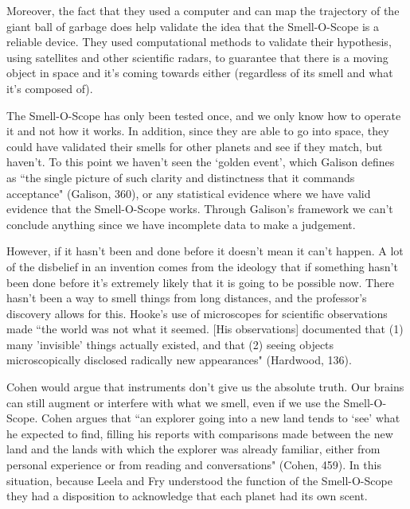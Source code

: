 \documentclass[11pt, oneside]{article}
\begin{document}

\par Moreover, the fact that they used a computer and can map the trajectory of the giant ball of garbage does help validate the idea that the Smell-O-Scope is a reliable device. They used computational methods to validate their hypothesis, using satellites and other scientific radars, to guarantee that there is a moving object in space and it's coming towards either (regardless of its smell and what it's composed of). 


\par The Smell-O-Scope has only been tested once, and we only know how to operate it and not how it works. In addition, since they are able to go into space, they could have validated their smells for other planets and see if they match, but haven't. To this point we haven't seen the `golden event', which Galison defines as ``the single picture of such clarity and distinctness that it commands acceptance" (Galison, 360), or any statistical evidence where we have valid evidence that the Smell-O-Scope works. Through Galison's framework we can't conclude anything since we have incomplete data to make a judgement.

\par However, if it hasn't been and done before it doesn't mean it can't happen. A lot of the disbelief in an invention comes from the ideology that if something hasn't been done before it's extremely likely that it is going to be possible now. There hasn't been a way to smell things from long distances, and the professor's discovery allows for this. Hooke's use of microscopes for scientific observations made ``the world was not what it seemed. [His observations] documented that (1) many 'invisible' things actually existed, and that (2) seeing objects microscopically disclosed radically new appearances" (Hardwood, 136). 

\par Cohen would argue that instruments don't give us the absolute truth. Our brains can still augment or interfere with what we smell, even if we use the Smell-O-Scope. Cohen argues that ``an explorer going into a new land tends to `see' what he expected to find, filling his reports with comparisons made between the new land and the lands with which the explorer was already familiar, either from personal experience or from reading and conversations" (Cohen, 459). In this situation, because Leela and Fry understood the function of the Smell-O-Scope they had a disposition to acknowledge that each planet had its own scent. 
\end{document}
